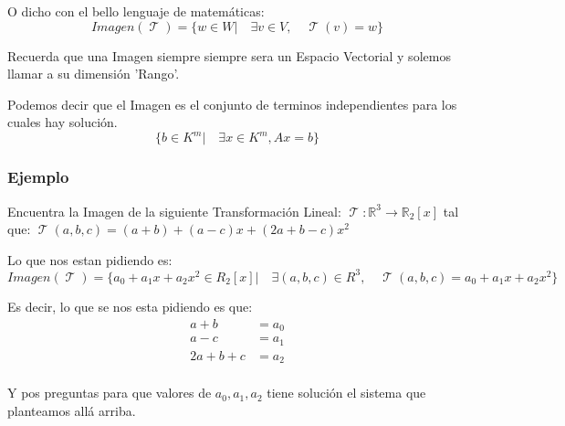 \documentclass[12pt]{report}                                    %
\DeclareMathOperator \LinealTransformation {\mathcal{T}}
\begin{document}
        O dicho con el bello lenguaje de matemáticas:
        \begin{equation}
            Imagen(\LinealTransformation) = \{w \in W |\quad \exists v \in V ,\quad \LinealTransformation(v) = w\}
        \end{equation}

        Recuerda que una Imagen siempre siempre sera un Espacio Vectorial y solemos
        llamar a su dimensión 'Rango'.

        Podemos decir que el Imagen es el conjunto de terminos independientes para los cuales
        hay solución.
        \begin{equation*}
            \{b \in K^m |\quad \exists x \in K^m, Ax = b \}
        \end{equation*}


            \clearpage
            \subsubsection{Ejemplo}
            Encuentra la Imagen de la siguiente Transformación Lineal:
            $\LinealTransformation : \mathbb{R}^3 \to \mathbb{R}_2[x]$ tal que: 
            $\LinealTransformation(a,b,c) = (a+b) + (a-c)x + (2a+b-c)x^2$

            Lo que nos estan pidiendo es:
            \begin{equation*}
                Imagen(\LinealTransformation) = 
                \{a_0+a_1x+a_2x^2 \in R_2[x] |\quad \exists (a,b,c) \in R^3 ,\quad 
                \LinealTransformation(a,b,c) = a_0+a_1x+a_2x^2\}
            \end{equation*}

            Es decir, lo que se nos esta pidiendo es que:
            \begin{equation*}
            \begin{split}
                a + b           & = a_0 \\
                a - c           & = a_1 \\
                2a + b + c      & = a_2 \\
             \end{split}
            \end{equation*}

            Y pos preguntas para que valores de $a_0, a_1, a_2$ tiene solución el 
            sistema que planteamos allá arriba.
\end{document}
